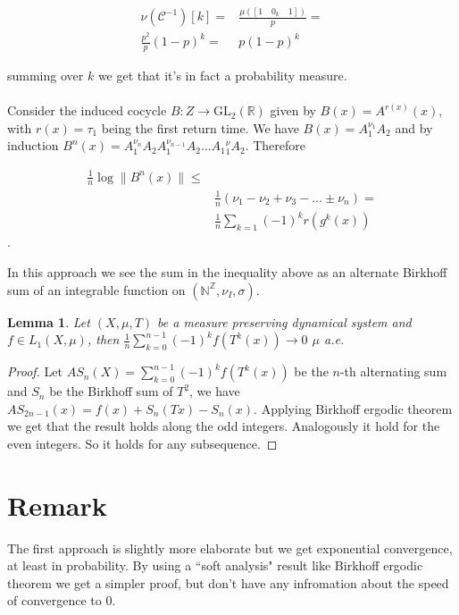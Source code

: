 \documentclass{article}
\newtheorem{lemma}[theorem]{Lemma}
\begin{document}
\begin{align*}
\nu(\mathcal{C}^{-1})[k]=& \frac{\mu([1\quad 0_k \quad 1])}{p}=\\
\frac{p^2}{p}(1-p)^k=&p(1-p)^k
\end{align*}

summing over $k$ we get that it's in fact a probability measure. 
\paragraph{}
Consider the induced cocycle $B:Z\to \text{GL}_2(\mathbb{R})$
given by $B(x)=A^{r(x)}(x)$, with $r(x)=\tau_1$ being the
first return time. We have $B(x)=A_1^{\nu_1}A_2$ and by induction
$B^n(x)=A_1^{\nu_n} A_2 A_1^{\nu_{n-1}}A_2\ldots A_1{^\nu_1} A_2$.
Therefore

\begin{align*}
\frac{1}{n}\log \|B^n (x)\|\leq& \\
 &\frac{1}{n} (\nu_1-\nu_2+\nu_3-\ldots  \pm \nu_n)=\\
 &\frac{1}{n}\sum_{k=1}(-1)^k r(g^k(x))
\end{align*}.

In this approach we see the sum in the inequality above as an
alternate Birkhoff sum of an integrable function on 
$(\mathbb{N}^\mathbb{Z},\nu_I,\sigma)$.

\begin{lemma}
Let $(X,\mu,T)$ be a measure preserving dynamical system and $f\in L_1(X,\mu)$,
then $\frac{1}{n}\sum_{k=0}^{n-1} (-1)^kf(T^k(x))\to 0$ $\mu$ a.e.
\end{lemma}

\begin{proof}
    Let $AS_n(X)=\sum_{k=0}^{n-1}(-1)^k f(T^k(x))$ be the $n$-th alternating sum and
    $S_n$ be the Birkhoff sum of $T^2$, we have $AS_{2n-1}(x)=f(x)+S_n(Tx)-
    S_n(x)$. Applying Birkhoff ergodic theorem we get that the
    result holds along the odd integers. Analogously it hold for 
    the even integers. So it holds for any subsequence.
\end{proof}


\section{Remark}

The first approach is slightly more elaborate but we get exponential
convergence, at least in probability. 
By using a ``soft analysis" result like Birkhoff ergodic theorem we get a simpler proof,
but don't have any infromation about the speed of convergence to 0.
\end{document}
